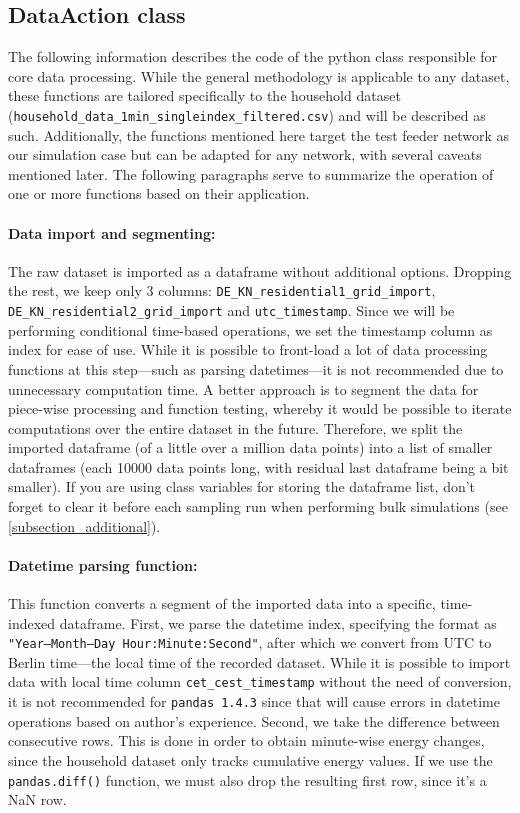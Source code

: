 \documentclass[a4paper,10pt]{report}
\begin{document}
\subsection{DataAction class}
The following information describes the code of the python class responsible for core data processing. While the general methodology is applicable to any dataset, these functions are tailored specifically to the household dataset (\texttt{household\_data\_1min\_singleindex\_filtered.csv}) and will be described as such. Additionally, the functions mentioned here target the test feeder network as our simulation case but can be adapted for any network, with several caveats mentioned later. The following paragraphs serve to summarize the operation of one or more functions based on their application.

\paragraph{Data import and segmenting:} The raw dataset is imported as a dataframe without additional options. Dropping the rest, we keep only 3 columns: \texttt{DE\_KN\_residential1\_grid\_import}, \texttt{DE\_KN\_residential2\_grid\_import} and \texttt{utc\_timestamp}. Since we will be performing conditional time-based operations, we set the timestamp column as index for ease of use. While it is possible to front-load a lot of data processing functions at this step---such as parsing datetimes---it is not recommended due to unnecessary computation time. A better approach is to segment the data for piece-wise processing and function testing, whereby it would be possible to iterate computations over the entire dataset in the future. Therefore, we split the imported dataframe (of a little over a million data points) into a list of smaller dataframes (each 10000 data points long, with residual last dataframe being a bit smaller). If you are using class variables for storing the dataframe list, don't forget to clear it before each sampling run when performing bulk simulations (see \cref{subsection_additional}).

\paragraph{Datetime parsing function:} This function converts a segment of the imported data into a specific, time-indexed dataframe. First, we parse the datetime index, specifying the format as \texttt{"Year--Month--Day Hour:Minute:Second"}, after which we convert from UTC to Berlin time---the local time of the recorded dataset. While it is possible to import data with local time column \texttt{cet\_cest\_timestamp} without the need of conversion, it is not recommended for \texttt{pandas 1.4.3} since that will cause errors in datetime operations based on author's experience. Second, we take the difference between consecutive rows. This is done in order to obtain minute-wise energy changes, since the household dataset only tracks cumulative energy values. If we use the \texttt{pandas.diff()} function, we must also drop the resulting first row, since it's a NaN row.
\end{document}
